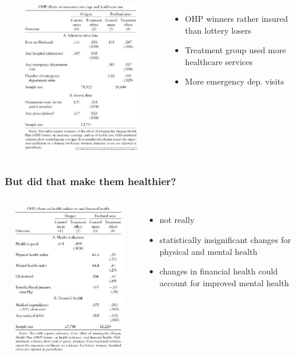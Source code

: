 \documentclass{beamer}
\begin{document}
\begin{frame}

\begin{columns}
\includegraphics[width=10cm,height=6.5cm,keepaspectratio]{OHP Table 1} 

\begin{itemize}
	\item OHP winners rather insured than lottery losers
	\item Treatment group used more healthcare services
	\item More emergency dep. visits
\end{itemize}

\end{columns}

\end{frame}


\begin{frame}
\frametitle{But did that make them healthier?}
\begin{columns}
\includegraphics[width=10cm,height=6.5cm,keepaspectratio]{OHP Table 2}

\begin{itemize}
	\item not really
	\item statistically insignificant changes for physical and mental health
	\item changes in financial health could account for improved mental
health
\end{itemize}

\end{columns}

\end{frame}
\end{document}
